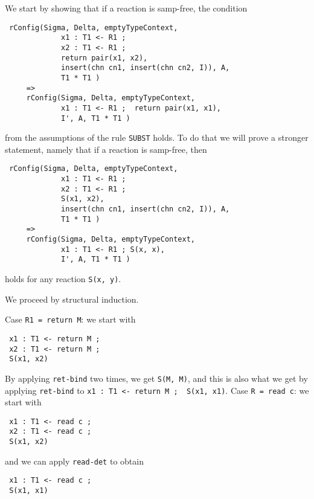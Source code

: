 \documentclass{article}
\begin{document}
\begin{itemize}
 We start by showing that if a reaction is samp-free, the 
 condition 
 \begin{lstlisting}
 rConfig(Sigma, Delta, emptyTypeContext,
             x1 : T1 <- R1 ; 
             x2 : T1 <- R1 ; 
             return pair(x1, x2),
             insert(chn cn1, insert(chn cn2, I)), A, 
             T1 * T1 )
     => 
     rConfig(Sigma, Delta, emptyTypeContext,
             x1 : T1 <- R1 ;  return pair(x1, x1),
             I', A, T1 * T1 )
 \end{lstlisting}
 \noindent from the assumptions of the rule \verb+SUBST+
 holds.
 To do that we will prove a stronger statement, namely that 
 if a reaction is samp-free, then 
 \begin{lstlisting}
 rConfig(Sigma, Delta, emptyTypeContext,
             x1 : T1 <- R1 ; 
             x2 : T1 <- R1 ; 
             S(x1, x2),
             insert(chn cn1, insert(chn cn2, I)), A, 
             T1 * T1 )
     => 
     rConfig(Sigma, Delta, emptyTypeContext,
             x1 : T1 <- R1 ; S(x, x),
             I', A, T1 * T1 )
 \end{lstlisting}
 \noindent
 holds for any reaction \verb+S(x, y)+.
 
 We proceed by structural induction.

 Case \verb+R1 = return M+:
 we start with
 \begin{lstlisting}
 x1 : T1 <- return M ; 
 x2 : T1 <- return M ; 
 S(x1, x2)
 \end{lstlisting}
 By applying \verb+ret-bind+ two times, we get \verb+S(M, M)+, and this
 is also what we get by applying \verb+ret-bind+ to \verb+x1 : T1 <- return M ;  S(x1, x1)+.
 Case \verb+R = read c+:
 we start with 
  \begin{lstlisting}
 x1 : T1 <- read c ; 
 x2 : T1 <- read c ; 
 S(x1, x2)
 \end{lstlisting}
 \noindent and we can apply \verb+read-det+ to obtain
   \begin{lstlisting}
 x1 : T1 <- read c ; 
 S(x1, x1)
 \end{lstlisting}
 

\end{itemize}
\end{document}
